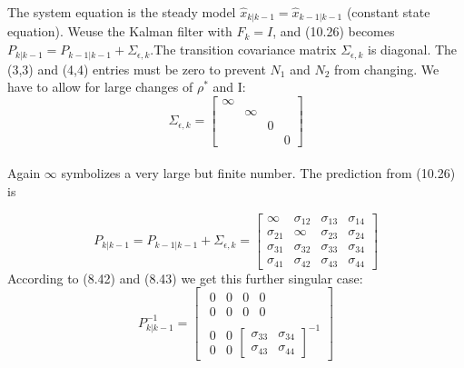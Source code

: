 The system equation is the steady model $\hat{x}_{k|k-1}=\hat{x}_{k-1|k-1}$ (constant state equation). Weuse the Kalman filter with $F_{k}=I$, and (10.26) becomes $P_{k|k-1}=P_{k-1|k-1}+\Sigma_{\epsilon,k}$.The transition covariance matrix $\Sigma_{\epsilon,k}$ is diagonal. The (3,3) and (4,4) entries must be zero to prevent $N_{1}$ and $N_{2}$ from changing. We have to allow for large changes of $\rho^{*}$ and I:
$$
\Sigma_{\epsilon,k}=
\begin{bmatrix}
\infty \\
&\infty \\
&&0\\
&&&0
\end{bmatrix}
$$\\
Again $\infty$ symbolizes a very large but finite number. The prediction from (10.26) is






\begin{equation}
P_{k|k-1}=P_{k-1|k-1}+\Sigma_{\epsilon,k}=
\begin{bmatrix}
\infty & \sigma_{12} & \sigma_{13} & \sigma_{14}\\
\sigma_{21} & \infty & \sigma_{23} & \sigma_{24}\\
\hline
\sigma_{31} & \sigma_{32}& \sigma_{33} & \sigma_{34}\\
\sigma_{41} & \sigma_{42}& \sigma_{43} & \sigma_{44}
\end{bmatrix}
\end{equation}
According to (8.42) and (8.43) we get this further singular case:
$$
P_{k|k-1}^{-1}=
\begin{bmatrix}
\begin{matrix}
0&0\\
0&0
\end{matrix}
\begin{matrix}
0&0\\
0&0
\end{matrix}\\
\begin{matrix}
0&0\\
0&0
\end{matrix}
\begin{bmatrix}
\sigma_{33} & \sigma_{34}\\
\sigma_{43} & \sigma_{44}
\end{bmatrix}^{-1}
\end{bmatrix}
$$




